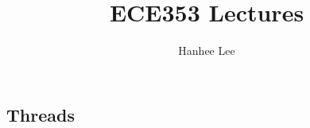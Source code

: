\documentclass{article}
\title{ECE353 Lectures}
\author{Hanhee Lee}
\begin{document}
\maketitle

\tableofcontents

\begin{center}
    \section{Threads}
\end{center}


\newpage
\end{document}
